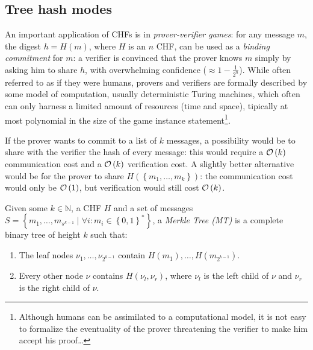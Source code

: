 \subsection{Tree hash modes}
An important application of CHFs is in \emph{prover-verifier games}:
for any message \(m\), the digest \(h = H\left(m\right)\), where \(H\) is an \(n\) CHF, can be
used as a \emph{binding commitment} for \(m\): a verifier is convinced that the prover knows \(m\)
simply by asking him to share \(h\), with overwhelming confidence (\(\approx 1 - \frac{1}{2^n}\)).
While often referred to as if they were humans, provers and verifiers are formally described by
some model of computation, usually deterministic Turing machines, which often can only harness a
limited amount of resources (time and space), tipically at most polynomial in the size of the game
instance statement\footnote{Although humans can be  assimilated to a computational model, it is
	not easy to formalize the eventuality of the prover threatening the verifier to make him accept
	his proof\dots}.

If the prover wants to commit to a list of \(k\) messages, a possibility would be to share with the
verifier the hash of every message: this would require a \(\mathcal{O}\left(k\right)\) communication cost
and a \(\mathcal{O}\left(k\right)\) verification cost.
A slightly better alternative would be for the prover to share
\(H\left(\left\{m_1, \dots, m_k\right\}\right)\): the communication cost would only be
\(\mathcal{O}\left(1\right)\), but verification would still cost \(\mathcal{O}\left(k\right)\).
\begin{definition}
	Given some \(k \in \mathbb{N}\), a CHF \(H\) and a set of messages
	\(S = \left\{m_1, \dots, m_{s^{k-1}} \mid \forall i\colon m_i \in
	{\left\{0, 1\right\}}^*\right\} \), a \emph{Merkle Tree (MT)} is a complete binary tree of
	height \(k\) such that:
	\begin{enumerate}
		\item The leaf nodes \(\nu_1, \dots, \nu_{2^{k-1}}\) contain \(H\left(m_1\right), \dots,
		      H\left(m_{2^{k-1}}\right)\).
		\item Every other node \(\nu \) contains \(H\left(\nu_l, \nu_r\right)\), where \(\nu_l\) is
		      the left child of \(\nu \) and \(\nu_r\) is the right child of \(\nu \).
	\end{enumerate}
\end{definition}

